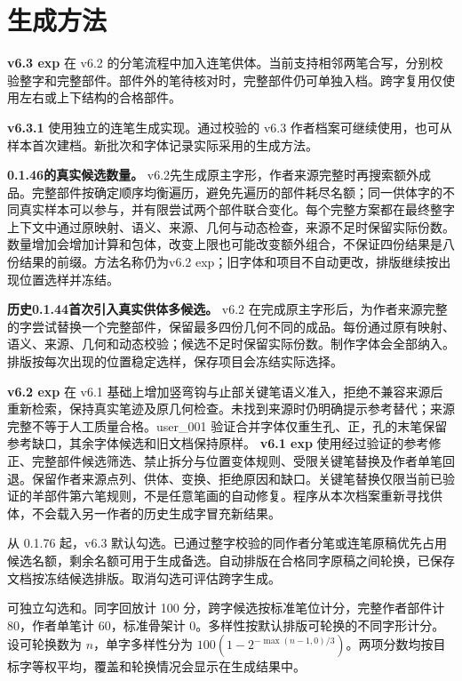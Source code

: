 
\section{生成方法}
\textbf{v6.3 exp} 在 v6.2 的分笔流程中加入连笔供体。当前支持相邻两笔合写，分别校验整字和完整部件。部件外的笔待核对时，完整部件仍可单独入档。跨字复用仅使用左右或上下结构的合格部件。

\textbf{v6.3.1} 使用独立的连笔生成实现。通过校验的 v6.3 作者档案可继续使用，也可从样本首次建档。新批次和字体记录实际采用的生成方法。

\textbf{0.1.46的真实候选数量。} v6.2先生成原主字形，作者来源完整时再搜索额外成品。完整部件按确定顺序均衡遍历，避免先遍历的部件耗尽名额；同一供体字的不同真实样本可以参与，并有限尝试两个部件联合变化。每个完整方案都在最终整字上下文中通过原映射、语义、来源、几何与动态检查，来源不足时保留实际份数。数量增加会增加计算和包体，改变上限也可能改变额外组合，不保证四份结果是八份结果的前缀。方法名称仍为v6.2 exp；旧字体和项目不自动更改，排版继续按出现位置选样并冻结。

\textbf{历史0.1.44首次引入真实供体多候选。} v6.2 在完成原主字形后，为作者来源完整的字尝试替换一个完整部件，保留最多四份几何不同的成品。每份通过原有映射、语义、来源、几何和动态校验；候选不足时保留实际份数。制作字体会全部纳入。排版按每次出现的位置稳定选样，保存项目会冻结实际选择。

\textbf{v6.2 exp} 在 v6.1 基础上增加竖弯钩与止部关键笔语义准入，拒绝不兼容来源后重新检索，保持真实笔迹及原几何检查。未找到来源时仍明确提示参考替代；来源完整不等于人工质量合格。user\_001 验证合并字体仅重生孔、正，孔的末笔保留参考缺口，其余字体候选和旧文档保持原样。
\textbf{v6.1 exp} 使用经过验证的参考修正、完整部件候选筛选、禁止拆分与位置变体规则、受限关键笔替换及作者单笔回退。保留作者来源点列、供体、变换、拒绝原因和缺口。关键笔替换仅限当前已验证的羊部件第六笔规则，不是任意笔画的自动修复。程序从本次档案重新寻找供体，不会载入另一作者的历史生成字冒充新结果。

从 0.1.76 起，v6.3 默认勾选。已通过整字校验的同作者分笔或连笔原稿优先占用候选名额，剩余名额可用于生成备选。自动排版在合格同字原稿之间轮换，已保存文档按冻结候选排版。取消勾选可评估跨字生成。

可独立勾选和。同字回放计 100 分，跨字候选按标准笔位计分，完整作者部件计 80，作者单笔计 60，标准骨架计 0。多样性按默认排版可轮换的不同字形计分。设可轮换数为 $n$，单字多样性分为 $100(1-2^{-\max(n-1,0)/3})$。两项分数均按目标字等权平均，覆盖和轮换情况会显示在生成结果中。

